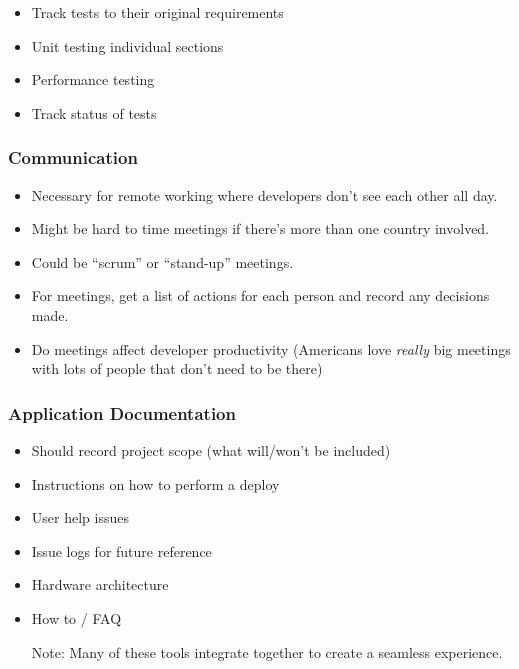\begin{itemize}
	\item Track tests to their original requirements
	\item Unit testing individual sections
	\item Performance testing
	\item Track status of tests
\end{itemize}

\subsubsection{Communication}\label{ssub:communication}

\begin{itemize}
	\item Necessary for remote working where developers don't see each other all day.
	\item Might be hard to time meetings if there's more than one country involved.
	\item Could be ``scrum'' or ``stand-up'' meetings.
	\item For meetings, get a list of actions for each person and record any decisions made.
	\item Do meetings affect developer productivity (Americans love \emph{really} big meetings with lots of people that don't need to be there)
\end{itemize}

\subsubsection{Application Documentation}\label{ssub:application_documentation}

\begin{itemize}
	\item Should record project scope (what will/won't be included)
	\item Instructions on how to perform a deploy
	\item User help issues
	\item Issue logs for future reference
	\item Hardware architecture
	\item How to / FAQ
\end{itemize}

\begin{note}
	\begin{itemize}
		\item[Note:] Many of these tools integrate together to create a seamless experience.
	\end{itemize}
\end{note}
